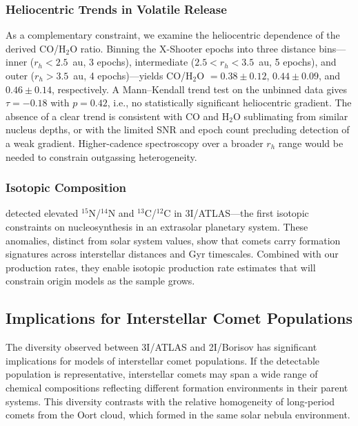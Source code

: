 \documentclass[preprint2]{aastex631}
\begin{document}
\subsubsection{Heliocentric Trends in Volatile Release}

As a complementary constraint, we examine the heliocentric dependence of the derived CO/H$_2$O ratio. Binning the X-Shooter epochs into three distance bins---inner ($r_h < 2.5$~au, 3 epochs), intermediate ($2.5 < r_h < 3.5$~au, 5 epochs), and outer ($r_h > 3.5$~au, 4 epochs)---yields CO/H$_2$O $= 0.38 \pm 0.12$, $0.44 \pm 0.09$, and $0.46 \pm 0.14$, respectively. A Mann--Kendall trend test on the unbinned data gives $\tau = -0.18$ with $p = 0.42$, i.e., no statistically significant heliocentric gradient. The absence of a clear trend is consistent with CO and H$_2$O sublimating from similar nucleus depths, or with the limited SNR and epoch count precluding detection of a weak gradient. Higher-cadence spectroscopy over a broader $r_h$ range would be needed to constrain outgassing heterogeneity.

\subsubsection{Isotopic Composition}

\citet{opitom26} detected elevated $^{15}$N/$^{14}$N and $^{13}$C/$^{12}$C in 3I/ATLAS---the first isotopic constraints on nucleosynthesis in an extrasolar planetary system. These anomalies, distinct from solar system values, show that comets carry formation signatures across interstellar distances and Gyr timescales. Combined with our production rates, they enable isotopic production rate estimates that will constrain origin models as the sample grows.

\subsection{Implications for Interstellar Comet Populations}

The diversity observed between 3I/ATLAS and 2I/Borisov has significant implications for models of interstellar comet populations. If the detectable population is representative, interstellar comets may span a wide range of chemical compositions reflecting different formation environments in their parent systems. This diversity contrasts with the relative homogeneity of long-period comets from the Oort cloud, which formed in the same solar nebula environment.
\end{document}
